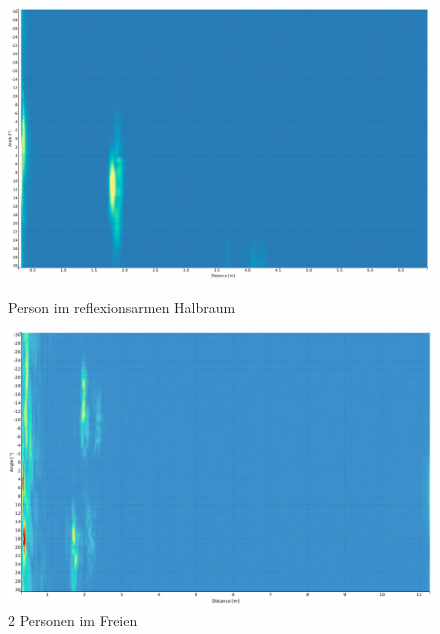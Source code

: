\clearpage
\begin{figure}[htb]
\begin{minipage}{1.0\textwidth}
\includegraphics[width=\textwidth]{graphics/image_test_obj_person_0.png}
\caption{Person im reflexionsarmen Halbraum} %
\label{fig:image_test_obj_person_0}
%
\end{minipage}
\begin{minipage}{1.0\textwidth}
\includegraphics[width=\textwidth]{graphics/image_test_obj_person_1.png}
\caption{2 Personen im Freien} %
\label{fig:image_test_obj_person_1}
%
\end{minipage}
\end{figure}


